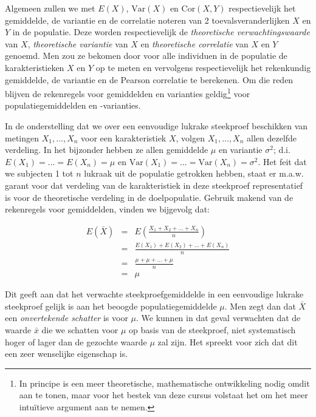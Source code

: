 \documentclass[
  dutch,
  letterpaper,
  12pt]{book}
\theoremstyle{definition}
\theoremstyle{definition}
\theoremstyle{definition}
\theoremstyle{remark}
\begin{document}
Algemeen zullen we met \(E(X)\), \(\text{Var}(X)\) en
\(\text{Cor}(X,Y)\) respectievelijk het gemiddelde, de variantie en de
correlatie noteren van 2 toevalsveranderlijken \(X\) en \(Y\) in de
populatie. Deze worden respectievelijk de \emph{theoretische
verwachtingswaarde} van \(X\), \emph{theoretische variantie} van \(X\)
en \emph{theoretische correlatie} van \(X\) en \(Y\) genoemd. Men zou ze
bekomen door voor alle individuen in de populatie de karakteristieken
\(X\) en \(Y\) op te meten en vervolgens respectievelijk het rekenkundig
gemiddelde, de variantie en de Pearson correlatie te berekenen. Om die
reden blijven de rekenregels voor gemiddelden en varianties
geldig\footnote{In principe is een meer theoretische, mathematische
  ontwikkeling nodig omdit aan te tonen, maar voor het bestek van deze
  cursus volstaat het om het meer intuïtieve argument aan te nemen.}
voor populatiegemiddelden en -varianties.

In de onderstelling dat we over een eenvoudige lukrake steekproef
beschikken van metingen \(X_1,...,X_n\) voor een karakteristiek \(X\),
volgen \(X_1,...,X_n\) allen dezelfde verdeling. In het bijzonder hebben
ze allen gemiddelde \(\mu\) en variantie \(\sigma^2\); d.i.
\(E(X_1)=...=E(X_n)=\mu\) en
\(\text{Var}(X_1)=...=\text{Var}(X_n)=\sigma^2\). Het feit dat we
subjecten 1 tot \(n\) lukraak uit de populatie getrokken hebben, staat
er m.a.w. garant voor dat verdeling van de karakteristiek in deze
steekproef representatief is voor de theoretische verdeling in de
doelpopulatie. Gebruik makend van de rekenregels voor gemiddelden,
vinden we bijgevolg dat:

\begin{eqnarray*}
E(\bar X) &=& E \left(\frac{X_1+ X_2+ ... + X_n}{n}\right) \\
&= & \frac{E(X_1)+ E(X_2)+ ... + E(X_n)}{n} \\
&=& \frac{\mu + \mu + ... +\mu}{n} \\
&= & \mu
\end{eqnarray*}

Dit geeft aan dat het verwachte steekproefgemiddelde in een eenvoudige
lukrake steekproef gelijk is aan het beoogde populatiegemiddelde
\(\mu\). Men zegt dan dat \(\bar X\) een \emph{onvertekende schatter} is
voor \(\mu\). We kunnen in dat geval verwachten dat de waarde \(\bar x\)
die we schatten voor \(\mu\) op basis van de steekproef, niet
systematisch hoger of lager dan de gezochte waarde \(\mu\) zal zijn. Het
spreekt voor zich dat dit een zeer wenselijke eigenschap is.
\end{document}
